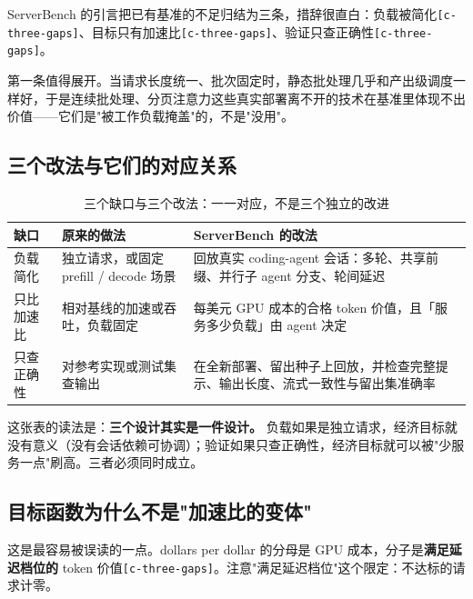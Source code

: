 ServerBench 的引言把已有基准的不足归结为三条，措辞很直白：负载被简化{\scriptsize\texttt{[c-\hspace{0pt}three-\hspace{0pt}gaps]}}、目标只有加速比{\scriptsize\texttt{[c-\hspace{0pt}three-\hspace{0pt}gaps]}}、验证只查正确性{\scriptsize\texttt{[c-\hspace{0pt}three-\hspace{0pt}gaps]}}。


第一条值得展开。当请求长度统一、批次固定时，静态批处理几乎和产出级调度一样好，于是连续批处理、分页注意力这些真实部署离不开的技术在基准里体现不出价值——它们是"被工作负载掩盖"的，不是"没用"。


\subsection{三个改法与它们的对应关系}

\begin{table}[t]
\centering
\footnotesize
\setlength{\tabcolsep}{4pt}
\caption{三个缺口与三个改法：一一对应，不是三个独立的改进}
\label{tab:1}
\begin{tabularx}{\textwidth}{lXX}
\toprule
缺口 & 原来的做法 & ServerBench 的改法 \\
\midrule
负载简化 & 独立请求，或固定 prefill / decode 场景 & 回放真实 coding-agent 会话：多轮、共享前缀、并行子 agent 分支、轮间延迟 \\
只比加速比 & 相对基线的加速或吞吐，负载固定 & 每美元 GPU 成本的合格 token 价值，且「服务多少负载」由 agent 决定 \\
只查正确性 & 对参考实现或测试集查输出 & 在全新部署、留出种子上回放，并检查完整提示、输出长度、流式一致性与留出集准确率 \\
\bottomrule
\end{tabularx}
\end{table}

这张表的读法是：\textbf{三个设计其实是一件设计。} 负载如果是独立请求，经济目标就没有意义（没有会话依赖可协调）；验证如果只查正确性，经济目标就可以被"少服务一点"刷高。三者必须同时成立。


\subsection{目标函数为什么不是"加速比的变体"}

这是最容易被误读的一点。dollars per dollar 的分母是 GPU 成本，分子是\textbf{满足延迟档位的} token 价值{\scriptsize\texttt{[c-\hspace{0pt}three-\hspace{0pt}gaps]}}。注意"满足延迟档位"这个限定：不达标的请求计零。


